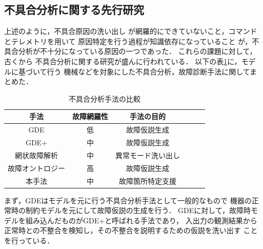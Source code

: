 \documentclass[11pt]{jsreport}
\begin{document}


\subsection{不具合分析に関する先行研究}
上述のように，不具合原因の洗い出し
が網羅的にできていないこと，コマンドとテレメトリを用いて
原因特定を行う過程が知識依存になっていること
が，不具合分析が不十分になっている原因の一つであった．%
これらの課題に対して，古くから%
不具合分析に関する研究が盛んに行われている．
以下の表\ref{tab:previous_research}に，モデルに基づいて行う
機械などを対象にした不具合分析，故障診断手法に関してまとめた．
\begin{table}[H]
   \centering
   \caption{不具合分析手法の比較}
   \label{tab:previous_research}
      \begin{tabular}{cccccc} \hline%
         手法&故障網羅性&手法の目的%
         \\ \hline
         GDE&低&故障仮説生成%
         \\ %
         GDE+\cite{Struss1989}&中&故障仮説生成%
         \\
         網状故障解析\cite{Yamaguchi2014}&中&異常モード洗い出し%
         \\
         故障オントロジー\cite{Kitamura1999}&高&故障仮説生成%
         \\
         本手法&中%
         &故障箇所特定支援%
         \\ \hline
      \end{tabular}
\end{table}
まず，GDEはモデルを元に行う不具合分析手法として一般的なもので
機器の正常時の制約モデルを元にして故障仮説の生成を行う．
GDEに対して，故障時モデルを組み込んだものがGDE+\cite{Struss1989}と呼ばれる手法であり，
入出力の観測結果から正常時との不整合を検知し，その不整合を説明するための仮説を洗い出す
ことを行っている．\\
\end{document}
